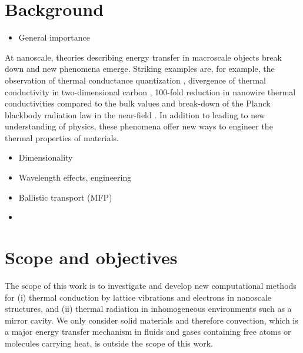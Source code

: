 
\section{Background}

\begin{itemize}
 \item General importance
\end{itemize}

At nanoscale, theories describing energy transfer in macroscale objects break down and new phenomena emerge. Striking examples are, for example, the observation of thermal conductance quantization \cite{schwab00}, divergence of thermal conductivity in two-dimensional carbon \cite{xu14}, 100-fold reduction in nanowire thermal conductivities compared to the bulk values \cite{} and break-down of the Planck blackbody radiation law in the near-field \cite{}. In addition to leading to new understanding of physics, these phenomena offer new ways to engineer the thermal properties of materials.


\begin{itemize}
 \item Dimensionality
 \item Wavelength effects, engineering
 \item Ballistic transport (MFP)
 \item 
\end{itemize}


\section{Scope and objectives}


The scope of this work is to investigate and develop new computational methods for (i) thermal conduction by lattice vibrations and electrons in nanoscale structures, and (ii) thermal radiation in inhomogeneous environments such as a mirror cavity. We only consider solid materials and therefore convection, which is a major energy transfer mechanism in fluids and gases containing free atoms or molecules carrying heat, is outside the scope of this work. %

